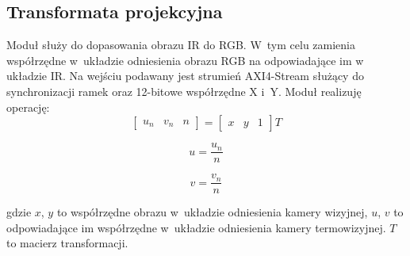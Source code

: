 \subsection {Transformata projekcyjna}

Moduł służy do dopasowania obrazu IR do RGB. 
W~tym celu zamienia współrzędne w~układzie odniesienia obrazu RGB na odpowiadające im w układzie IR. %
Na wejściu podawany jest strumień AXI4-Stream służący do synchronizacji ramek oraz 12-bitowe współrzędne X i~Y. 
Moduł realizuję operację:
\begin{equation}
\begin{bmatrix}
u_n & v_n & n
\end{bmatrix}
=
\begin{bmatrix}
x & y & 1
\end{bmatrix}
T
\end{equation}

\begin{equation}
u = \frac{u_n}{n}
\end{equation}

\begin{equation}
v = \frac{v_n}{n}
\end{equation}

\noindent
gdzie $x$, $y$ to współrzędne obrazu w~układzie odniesienia kamery wizyjnej, $u$, $v$ to odpowiadające im współrzędne w~układzie odniesienia kamery termowizyjnej. 
$T$ to macierz transformacji.

